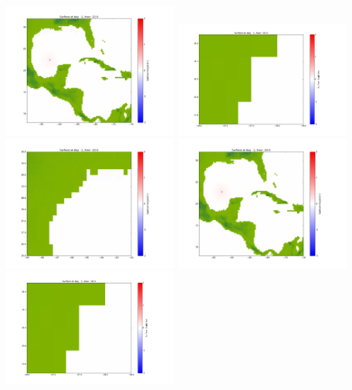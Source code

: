 \documentclass[11pt]{article}
\begin{document}
\vskip 10pt 
\includegraphics[width=0.475\textwidth]{frame0001fig1003.png}
\vskip 10pt 
\includegraphics[width=0.475\textwidth]{frame0002fig1001.png}
\includegraphics[width=0.475\textwidth]{frame0002fig1002.png}
\vskip 10pt 
\includegraphics[width=0.475\textwidth]{frame0002fig1003.png}
\vskip 10pt 
\includegraphics[width=0.475\textwidth]{frame0003fig1001.png}
\end{document}
